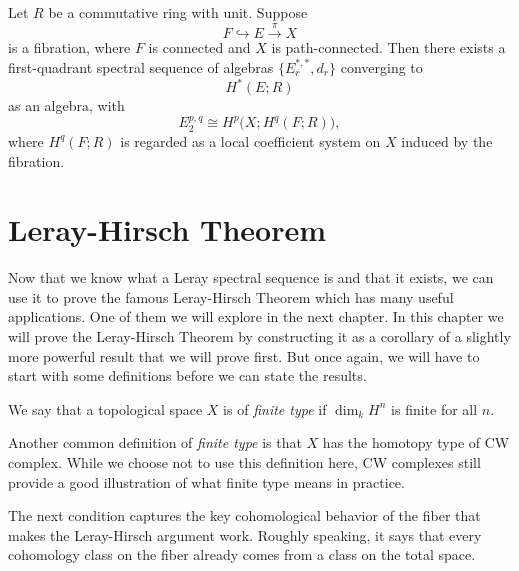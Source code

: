 \begin{theorem}
Let $R$ be a commutative ring with unit. Suppose
\begin{equation*}
    F\hookrightarrow E \overset{\pi}{\to} X
\end{equation*}
is a fibration, where $F$ is connected and $X$ is path-connected. Then there exists a first-quadrant spectral sequence of algebras $\{E_r^{*,*},d_r\}$ converging to
\begin{equation*}
    H^*(E;R)
\end{equation*}
as an algebra, with
\begin{equation*}
    E_2^{p,q}\cong H^p\bigl(X;H^q(F;R)\bigr),
\end{equation*}
where $H^q(F;R)$ is regarded as a local coefficient system on $X$ induced by the fibration.
\end{theorem}





\section{Leray-Hirsch  Theorem }
Now that we know what a Leray spectral sequence is and that it exists, we can use it to prove the famous Leray-Hirsch Theorem which has many useful applications. One of them we will explore in the next chapter. In this chapter we will prove the Leray-Hirsch Theorem by constructing it as a corollary of a slightly more powerful result that we will prove first. But once again, we will have to start with some definitions before we can state the results.
\begin{definition}
    We say that a topological space $X$ is of \textit{finite type} if $\dim_k H^n$ is finite for all $n$.
\end{definition}
\begin{example}
     Another common definition of \textit{finite type} is that $X$ has the homotopy type of  CW complex. While we choose not to use this definition here, CW complexes still provide a good illustration of what finite type means in practice.
\end{example}


The next condition captures the key cohomological behavior of the fiber that makes the Leray-Hirsch argument work. Roughly speaking, it says that every cohomology class on the fiber already comes from a class on the total space.


